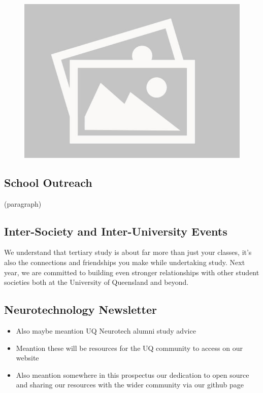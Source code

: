 \documentclass[a4paper,12pt]{report}
\begin{document}
\begin{figure}[H]
    \centering
    \includegraphics[width=0.9\linewidth]{./photos/placeholder.jpg}
\end{figure}

\subsection*{School Outreach}
(paragraph)

\subsection*{Inter-Society and Inter-University Events}
We understand that tertiary study is about far more than just your classes, it's also the connections and friendships you make while undertaking study.
Next year, we are committed to building even stronger relationships with other student societies both at the University of Queensland and beyond.

\newpage

\subsection*{Neurotechnology Newsletter}

\begin{itemize}
    \item Also maybe meantion UQ Neurotech alumni study advice
    \item Meantion these will be resources for the UQ community to access on our website
    \item Also meantion somewhere in this prospectus our dedication to open source and sharing 
    our resources with the wider community via our github page
\end{itemize}
\end{document}
